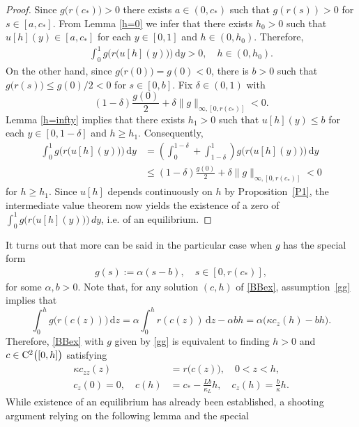 \documentclass[reqno,11pt]{amsart}
\numberwithin{equation}{section}
\newcommand{\rd}{\mathrm{d}}
\begin{document}
\begin{proof}
Since $g\bigl( r(c_*)\bigr)>0$ there exists $a\in (0,c_*)$ such that
$g(r(s))>0$ for $s\in [a,c_*]$. From Lemma \ref{h=0} we infer that
there exists $h_0>0$ such that $ u[h](y)\in [a,c_*]$ for each $y\in
[0,1]$ and $h\in (0,h_0)$. Therefore, 
\begin{align*}
\int_0^1 g\big(r(u[h](y)\big)\big)\,\rd y>0, \quad h\in (0,h_0).
\end{align*} 
On the other hand, since $g\big(r(0)\big)=g(0)<0$, there is $b>0$ such
that $g\bigl( r(s)\bigr )\le g(0)/2<0$ for $s\in [0,b]$. Fix $\delta\in (0,1)$
with
$$
(1-\delta)\frac{g(0)}{2}+\delta\|
g\|_{\infty,[0,r(c_*)]}  <0. 
$$ 
Lemma \ref{h=infty} implies that there exists  $h_1>0$ such that
$u[h](y)\le b$ for each $y\in [0,1-\delta]$ and $h\ge
h_1$. Consequently,
\begin{align*} 
\int_0^1 g\bigl(r(u[h](y)\big)\bigr)\,\rd
  y&=\left(\int_0^{1-\delta}+\int_{1-\delta}^1\right)
     g\bigl( r\bigl( u[h](y)\bigr)\bigr)\,\rd y\\
&\le(1-\delta)\frac{g(0)}{2}+\delta\|
g\|_{\infty,[0,r(c_*)]}<0
\end{align*}
for $h\ge h_1$.
Since $u[h]$ depends continuously on $h$ by Proposition~\ref{P1},
the intermediate value theorem now yields the existence of a zero of
$\int_0^1g \bigl( r \bigl( u[h](y)\bigr)\bigr)\, dy$, i.e. of an equilibrium.
\end{proof}
It turns out that more can be said in the particular case when $g$ has
the special form
\begin{align}\label{gg}
g(s):=\alpha(s-b),\quad s\in [0,r(c_*)],
\end{align}
for some $\alpha,b>0$. Note that, for any solution $(c,h)$ of
\eqref{BBex}, assumption~\eqref{gg} implies that 
$$
\int_0^h g\big(r(c(z))\big)\,\rd z=\alpha\int_0^h r(c(z))\,\rd z
-\alpha bh=\alpha \big(\kappa c_z(h)- bh\big).
$$
Therefore, \eqref{BBex} with $g$ given by \eqref{gg} is equivalent to
finding $h>0$ and $c\in {\rm C}^2\bigl([0,h]\bigr)$ satisfying
\begin{subequations}
\label{BBeex}
\begin{align}
\kappa c_{zz}(z)&= r\bigl( c(z)\bigr),\quad 0<z<h,\label{BBeex2}\\
c_z(0)=0,\quad c(h)&=c_*-\frac{L b}{\kappa_L}h,\quad
c_z(h)=\frac{b}{\kappa}h.\label{BBeex4} 
\end{align}
 \end{subequations}
While existence of an equilibrium has already been established, a
shooting argument relying on the following lemma and the special
\end{document}
